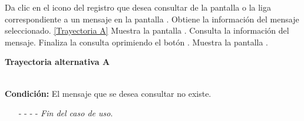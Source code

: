 	\begin{UCtrayectoria}
		\UCpaso[\UCactor] Da clic en el icono   del registro que desea consultar de la pantalla  o la liga correspondiente a un mensaje en la pantalla .
		\UCpaso[\UCsist] Obtiene la información del mensaje seleccionado. \hyperlink{CU9-4:TAA}{[Trayectoria A]}
		\UCpaso[\UCsist] Muestra la pantalla .
		\UCpaso[\UCactor] Consulta la información del mensaje.
		\UCpaso[\UCactor] Finaliza la consulta oprimiendo el botón .
		\UCpaso[\UCsist] Muestra la pantalla .
	\end{UCtrayectoria}		
\hypertarget{CU9-4:TAA}{\textbf{Trayectoria alternativa A}}\\
\noindent \textbf{Condición:} El mensaje que se desea consultar no existe.
\begin{enumerate}
	\UCpaso[\UCsist] Muestra el mensaje  en la pantalla .
	\item[- -] - - {\em {Fin del caso de uso}}.
\end{enumerate}

	

